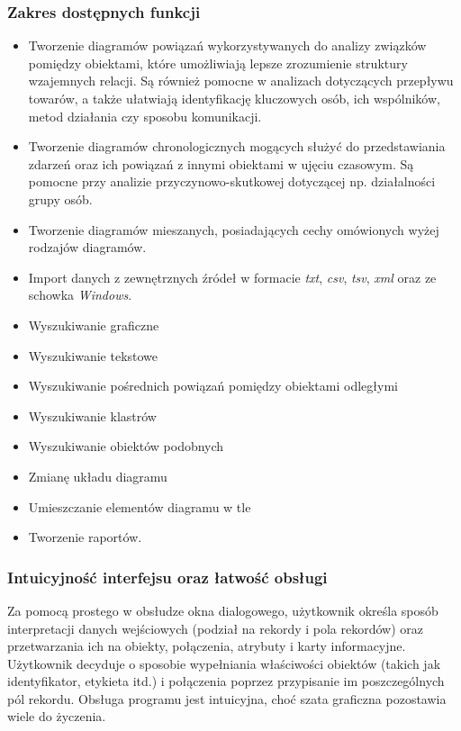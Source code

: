 \documentclass[11pt,a4paper]{article}
\begin{document}
\subsubsection*{Zakres dostępnych funkcji}

\begin{itemize}
	\item Tworzenie diagramów powiązań wykorzystywanych do analizy związków pomiędzy obiektami, które umożliwiają lepsze zrozumienie struktury wzajemnych relacji. Są również pomocne w analizach dotyczących przepływu towarów, a także ułatwiają identyfikację kluczowych osób, ich wspólników, metod działania czy sposobu komunikacji.
	\item Tworzenie diagramów chronologicznych mogących służyć do przedstawiania zdarzeń oraz ich powiązań z innymi obiektami w ujęciu czasowym. Są pomocne przy analizie przyczynowo-skutkowej dotyczącej np. działalności grupy osób.
	\item Tworzenie diagramów mieszanych, posiadających cechy omówionych wyżej rodzajów diagramów.
	\item Import danych z zewnętrznych źródeł w formacie \emph{txt}, \emph{csv}, \emph{tsv}, \emph{xml} oraz ze schowka \emph{Windows}.
	\item Wyszukiwanie graficzne
	\item Wyszukiwanie tekstowe
	\item Wyszukiwanie pośrednich powiązań pomiędzy obiektami odległymi
	\item Wyszukiwanie klastrów
	\item Wyszukiwanie obiektów podobnych
	\item Zmianę układu diagramu
	\item Umieszczanie elementów diagramu w tle
	\item Tworzenie raportów.
\end{itemize}

\subsubsection*{Intuicyjność interfejsu oraz łatwość obsługi}

Za pomocą prostego w obsłudze okna dialogowego, użytkownik określa sposób interpretacji danych wejściowych (podział na rekordy i pola rekordów) oraz przetwarzania ich na obiekty, połączenia, atrybuty i karty informacyjne. Użytkownik decyduje o sposobie wypełniania właściwości obiektów (takich jak identyfikator, etykieta itd.) i połączenia poprzez przypisanie im poszczególnych pól rekordu. Obsługa programu jest intuicyjna, choć szata graficzna pozostawia wiele do życzenia.
\end{document}

